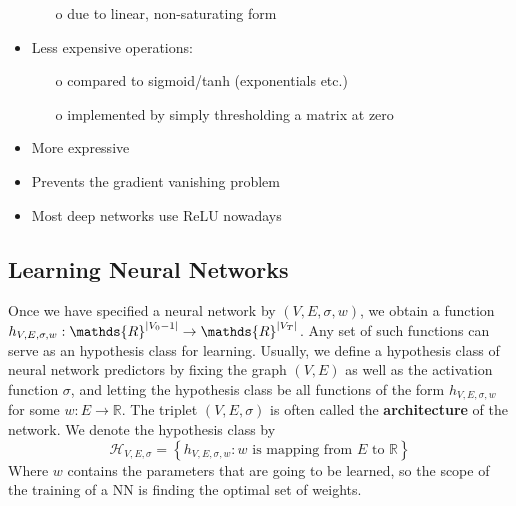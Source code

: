 \documentclass[12pt]{report}
\theoremstyle{plain}
\newcommand\mcl[1]{\mathcal{#1}}
\begin{document}
\begin{flushleft}
\begin{itemize}
\begin{itemize}
		\item[o] due to linear, non-saturating form
	\end{itemize}
	\item Less expensive operations:
	\begin{itemize}
		\item[o] compared to sigmoid/tanh (exponentials etc.)
		\item[o] implemented by simply thresholding a matrix at zero
	\end{itemize}
	\item More expressive
	\item Prevents the gradient vanishing problem
	\item Most deep networks use ReLU nowadays
\end{itemize}

\subsection{Learning Neural Networks}
Once we have specified a neural network by $(V,E,\sigma,w)$, we obtain a function $h_{V,E,\sigma,w}:\mathds{R}^{\abs{V_0-1}}\to\mathds{R}^{\abs{V_T}}$. Any set of such functions can serve as an hypothesis class for learning. Usually, we define a hypothesis class of neural network predictors by fixing the graph $(V,E)$ as well as the activation function $\sigma$, and letting the hypothesis class be all functions of the form $h_{V,E,\sigma,w}$ for some $w:E\to\mathds{R}$. The triplet $(V,E,\sigma)$ is often called the \textbf{architecture} of the network. We denote the hypothesis class by
\[ \mcl{H}_{V,E,\sigma}=\left\{h_{V,E,\sigma,w}: w \text{ is mapping from } E \text{ to } \mathds{R}\right\} \]
Where $w$ contains the parameters that are going to be learned, so the scope of the training of a NN is finding the optimal set of weights.


\end{flushleft}
\end{document}
